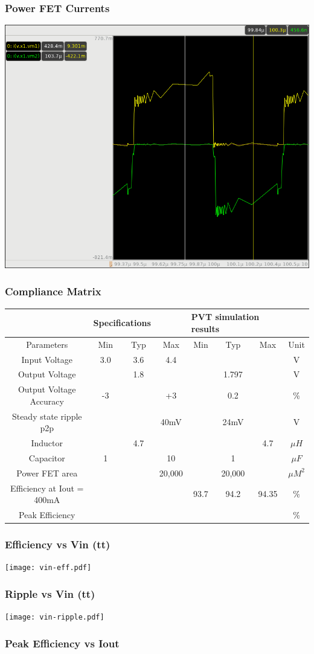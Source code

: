 \documentclass{beamer}
\begin{document}
\begin{frame}
  \frametitle{Power FET Currents}
  \includegraphics[scale=0.25]{hiside-lowside-current.png}
\end{frame}

\begin{frame}
  \frametitle{Compliance Matrix}
  \begin{center}
    {\scriptsize
      \begin{tabular}{| c | c | c | c | c  | c | c | c |}
        \hline      
         & \multicolumn{2}{l}{Specifications} & & \multicolumn{3}{l}{PVT
simulation results} &\\
        \hline
        Parameters & Min & Typ & Max & Min & Typ & Max & Unit \\
        \hline
        Input Voltage & 3.0 & 3.6 & 4.4 & & & & V \\
        Output Voltage & & 1.8 &  & & 1.797 & & V \\
        Output Voltage Accuracy & -3 & & +3 & & 0.2 & & \% \\
        Steady state ripple p2p &  & & 40mV & & 24mV & & V \\
        Inductor & & 4.7 & & & & 4.7 & $\mu H$ \\
        Capacitor & 1 &  & 10 & & 1 & & $\mu F$ \\
        Power FET area & & & 20,000 & & 20,000 & & $\mu M^2$ \\
        Efficiency at Iout = 400mA & & & & 93.7 & 94.2 & 94.35 & \% \\
        Peak Efficiency & & & &  & & & \% \\      
        \hline
      \end{tabular}
    }
  \end{center}

\end{frame}

\begin{frame}
  \frametitle{Efficiency vs Vin (tt) }
  \texttt{[image: vin-eff.pdf]}
\end{frame}

\begin{frame}
  \frametitle{Ripple vs Vin (tt)}
  \texttt{[image: vin-ripple.pdf]}
\end{frame}

\begin{frame}
  \frametitle{Peak Efficiency vs Iout}
\end{frame}
\end{document}
